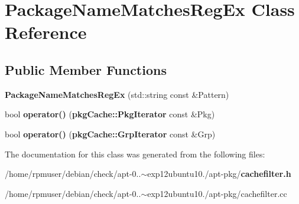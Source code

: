 \section{\-Package\-Name\-Matches\-Reg\-Ex \-Class \-Reference}
\label{classAPT_1_1CacheFilter_1_1PackageNameMatchesRegEx}
\subsection*{\-Public \-Member \-Functions}
\begin{DoxyCompactItemize}
\item 
{\bfseries \-Package\-Name\-Matches\-Reg\-Ex} (std\-::string const \&\-Pattern)\label{classAPT_1_1CacheFilter_1_1PackageNameMatchesRegEx_a198f8a63d3b97a8dadde337ab93c1195}

\item 
bool {\bfseries operator()} ({\bf pkg\-Cache\-::\-Pkg\-Iterator} const \&\-Pkg)\label{classAPT_1_1CacheFilter_1_1PackageNameMatchesRegEx_a8b4f56d3577102e20aadcff248a25885}

\item 
bool {\bfseries operator()} ({\bf pkg\-Cache\-::\-Grp\-Iterator} const \&\-Grp)\label{classAPT_1_1CacheFilter_1_1PackageNameMatchesRegEx_a01cbece7d55e59f38457ea4e77bc0d05}

\end{DoxyCompactItemize}


\-The documentation for this class was generated from the following files\-:\begin{DoxyCompactItemize}
\item 
/home/rpmuser/debian/check/apt-\/0..$\sim$exp12ubuntu10./apt-\/pkg/{\bf cachefilter.\-h}\item 
/home/rpmuser/debian/check/apt-\/0..$\sim$exp12ubuntu10./apt-\/pkg/cachefilter.\-cc\end{DoxyCompactItemize}
